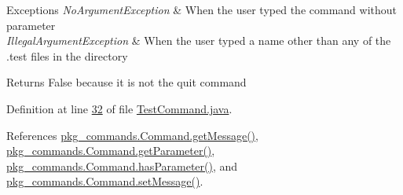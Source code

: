 \begin{DoxyExceptions}{Exceptions}
{\em No\-Argument\-Exception} & When the user typed the command without parameter \\
\hline
{\em Illegal\-Argument\-Exception} & When the user typed a name other than any of the .test files in the directory \\
\hline
\end{DoxyExceptions}
\begin{DoxyReturn}{Returns}
False because it is not the quit command 
\end{DoxyReturn}


Definition at line \hyperlink{TestCommand_8java_source_l00032}{32} of file \hyperlink{TestCommand_8java_source}{Test\-Command.\-java}.



References \hyperlink{Command_8java_source_l00097}{pkg\-\_\-commands.\-Command.\-get\-Message()}, \hyperlink{Command_8java_source_l00041}{pkg\-\_\-commands.\-Command.\-get\-Parameter()}, \hyperlink{Command_8java_source_l00073}{pkg\-\_\-commands.\-Command.\-has\-Parameter()}, and \hyperlink{Command_8java_source_l00089}{pkg\-\_\-commands.\-Command.\-set\-Message()}.


